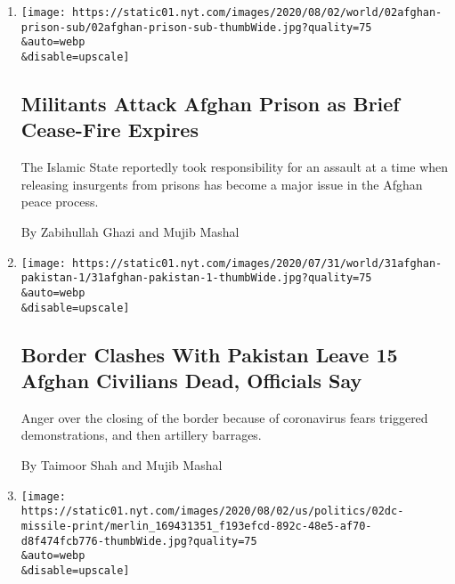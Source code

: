 \begin{enumerate}
\def\labelenumi{\arabic{enumi}.}
\item
  \href{/2020/08/02/world/asia/afghan-prison-attack-prisoners.html}{}

  \texttt{[image: https://static01.nyt.com/images/2020/08/02/world/02afghan-prison-sub/02afghan-prison-sub-thumbWide.jpg?quality=75\\\&auto=webp\\\&disable=upscale]}

  \hypertarget{militants-attack-afghan-prison-as-brief-cease-fire-expires}{%
  \subsection{Militants Attack Afghan Prison as Brief Cease-Fire
  Expires}\label{militants-attack-afghan-prison-as-brief-cease-fire-expires}}

  The Islamic State reportedly took responsibility for an assault at a
  time when releasing insurgents from prisons has become a major issue
  in the Afghan peace process.

  By Zabihullah Ghazi and Mujib Mashal
\item
  \href{/2020/07/31/world/asia/afghanistan-pakistan-border.html}{}

  \texttt{[image: https://static01.nyt.com/images/2020/07/31/world/31afghan-pakistan-1/31afghan-pakistan-1-thumbWide.jpg?quality=75\\\&auto=webp\\\&disable=upscale]}

  \hypertarget{border-clashes-with-pakistan-leave-15-afghan-civilians-dead-officials-say}{%
  \subsection{Border Clashes With Pakistan Leave 15 Afghan Civilians
  Dead, Officials
  Say}\label{border-clashes-with-pakistan-leave-15-afghan-civilians-dead-officials-say}}

  Anger over the closing of the border because of coronavirus fears
  triggered demonstrations, and then artillery barrages.

  By Taimoor Shah and Mujib Mashal
\item
  \href{/2020/07/30/world/asia/afghanistan-taliban-helicopter-missile.html}{}

  \texttt{[image: https://static01.nyt.com/images/2020/08/02/us/politics/02dc-missile-print/merlin\_169431351\_f193efcd-892c-48e5-af70-d8f474fcb776-thumbWide.jpg?quality=75\\\&auto=webp\\\&disable=upscale]}

  \hypertarget{a-rarely-seen-weapon-destroys-a-helicopter-in-afghanistan}{%
}
\end{enumerate}
